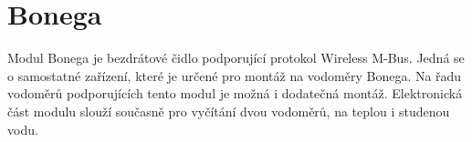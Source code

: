 \begin{table}[!ht]
\begin{tabular}{|c|l|c|}
\end{tabular}
\vspace{-10pt}
\end{table}


	

	\section{Bonega}

Modul Bonega je bezdrátové čidlo podporující protokol Wireless M-Bus. Jedná se o samostatné zařízení, které je určené pro montáž na vodoměry Bonega. Na řadu vodoměrů podporujících tento modul je možná i dodatečná montáž. Elektronická část modulu slouží současně pro vyčítání dvou vodoměrů, na teplou i studenou vodu.
	
